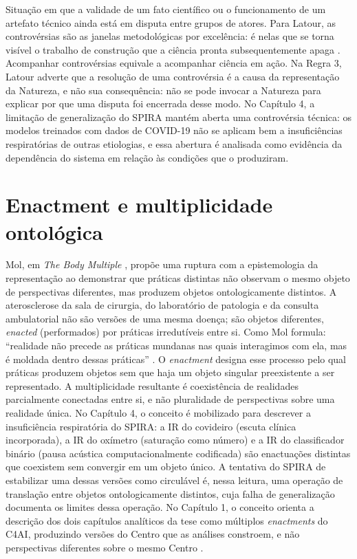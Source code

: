 \begin{description}
Situação em que a validade de um fato científico ou o funcionamento de um artefato técnico ainda está em disputa entre grupos de atores. Para Latour, as controvérsias são as janelas metodológicas por excelência: é nelas que se torna visível o trabalho de construção que a ciência pronta subsequentemente apaga \parencite[cap.~2]{Latour2011CienciaEmAcao}. Acompanhar controvérsias equivale a acompanhar ciência em ação. Na Regra 3, Latour adverte que a resolução de uma controvérsia é a causa da representação da Natureza, e não sua consequência: não se pode invocar a Natureza para explicar por que uma disputa foi encerrada desse modo. No Capítulo 4, a limitação de generalização do SPIRA mantém aberta uma controvérsia técnica: os modelos treinados com dados de COVID-19 não se aplicam bem a insuficiências respiratórias de outras etiologias, e essa abertura é analisada como evidência da dependência do sistema em relação às condições que o produziram.

\bigskip

\section*{Enactment e multiplicidade ontológica}

Mol, em \textit{The Body Multiple} \parencite{mol2002body}, propõe uma ruptura com a epistemologia da representação ao demonstrar que práticas distintas não observam o mesmo objeto de perspectivas diferentes, mas produzem objetos ontologicamente distintos. A aterosclerose da sala de cirurgia, do laboratório de patologia e da consulta ambulatorial não são versões de uma mesma doença; são objetos diferentes, \textit{enacted} (performados) por práticas irredutíveis entre si. Como Mol formula: ``realidade não precede as práticas mundanas nas quais interagimos com ela, mas é moldada dentro dessas práticas'' \parencite[p.~6]{mol2002body}. O \textit{enactment} designa esse processo pelo qual práticas produzem objetos sem que haja um objeto singular preexistente a ser representado. A multiplicidade resultante é coexistência de realidades parcialmente conectadas entre si, e não pluralidade de perspectivas sobre uma realidade única. No Capítulo 4, o conceito é mobilizado para descrever a insuficiência respiratória do SPIRA: a IR do covideiro (escuta clínica incorporada), a IR do oxímetro (saturação como número) e a IR do classificador binário (pausa acústica computacionalmente codificada) são enactuações distintas que coexistem sem convergir em um objeto único. A tentativa do SPIRA de estabilizar uma dessas versões como circulável é, nessa leitura, uma operação de translação entre objetos ontologicamente distintos, cuja falha de generalização documenta os limites dessa operação. No Capítulo 1, o conceito orienta a descrição dos dois capítulos analíticos da tese como múltiplos \textit{enactments} do C4AI, produzindo versões do Centro que as análises constroem, e não perspectivas diferentes sobre o mesmo Centro \parencite{mol2002body,MolLaw1994}.


\end{description}
